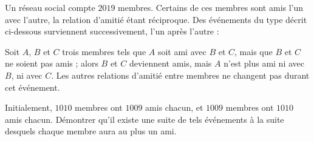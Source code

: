 Un réseau social compte $2019$ membres. Certains de ces membres sont amis l'un avec l'autre, la relation
d'amitié étant réciproque. Des événements du type décrit ci-dessous surviennent successivement, l'un après
l'autre :

Soit $A$, $B$ et $C$ trois membres tels que $A$ soit ami avec $B$ et $C$, mais que $B$ et $C$ ne soient pas
amis ; alors $B$ et $C$ deviennent amis, mais $A$ n'est plus ami ni avec $B$, ni avec $C$. Les autres
relations d'amitié entre membres ne changent pas durant cet événement.

Initialement, $1010$ membres ont $1009$ amis chacun, et $1009$ membres ont $1010$ amis chacun. Démontrer qu'il
existe une suite de tels événements à la suite desquels chaque membre aura au plus un ami.
